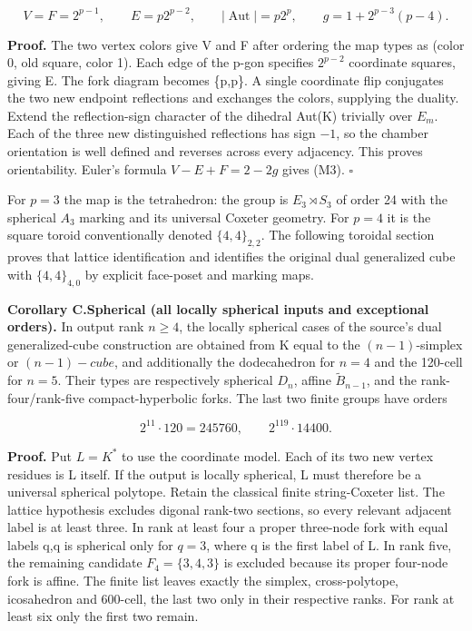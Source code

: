 \[
V=F=2^{p-1},\qquad E=p2^{p-2},\qquad
|\operatorname{Aut}|=p2^p,\qquad
g=1+2^{p-3}(p-4).
\tag{M3}
\]

\textbf{Proof.} The two vertex colors give V and F after ordering the
map types as (color 0, old square, color 1). Each edge of the p-gon
specifies \(2^{p-2}\) coordinate squares, giving E. The fork diagram
becomes \{p,p\}. A single coordinate flip conjugates the two new
endpoint reflections and exchanges the colors, supplying the duality.
Extend the reflection-sign character of the dihedral Aut(K) trivially
over \(E_m\). Each of the three new distinguished reflections has sign
\(-1\), so the chamber orientation is well defined and reverses across
every adjacency. This proves orientability. Euler's formula
\(V-E+F=2-2g\) gives (M3). \(\square\)

For \(p=3\) the map is the tetrahedron: the group is
\(E_{3}\rtimes S_{3}\) of order 24 with the spherical \(A_{3}\) marking
and its universal Coxeter geometry. For \(p=4\) it is the square toroid
conventionally denoted \(\{4,4\}_{2,2}\). The following toroidal section proves that lattice
identification and identifies the original dual generalized cube with
\(\{4,4\}_{4,0}\) by explicit face-poset and marking maps.

\textbf{Corollary C.Spherical (all locally spherical inputs and
exceptional orders).} In output rank \(n\ge 4\), the locally spherical
cases of the source's dual generalized-cube construction are obtained from K
equal to the \((n-1)\)-simplex or \((n-1)-cube\), and additionally the
dodecahedron for \(n=4\) and the 120-cell for \(n=5\). Their types are
respectively spherical \(D_n\), affine \(\widetilde B_{n-1}\), and the
rank-four/rank-five compact-hyperbolic forks. The last two finite groups
have orders

\[
2^{11}\cdot120=245760,
\qquad 2^{119}\cdot14400.
\tag{M4}
\]

\textbf{Proof.} Put \(L=K^*\) to use the coordinate model. Each of its
two new vertex residues is L itself. If the output is locally spherical,
L must therefore be a universal spherical polytope. Retain the classical
finite string-Coxeter list. The lattice hypothesis excludes digonal
rank-two sections, so every relevant adjacent label is at least three.
In rank at least four a proper three-node fork with equal labels q,q is
spherical only for \(q=3\), where q is the first label of L. In rank
five, the remaining candidate \(F_{4}=\{3,4,3\}\) is excluded because
its proper four-node fork is affine. The finite list leaves exactly the
simplex, cross-polytope, icosahedron and 600-cell, the last two only in
their respective ranks. For rank at least six only the first two remain.


